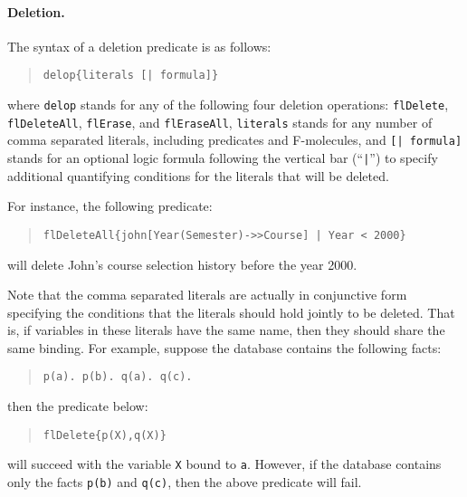\documentclass[11pt]{article}
\begin{document}
%
\paragraph{Deletion.} The syntax of a deletion predicate is as follows:
\begin{quote}
\begin{verbatim}
delop{literals [| formula]}
\end{verbatim}
\end{quote}
where {\tt delop} stands for any of the following four deletion
operations: {\tt flDelete}, {\tt flDeleteAll}, {\tt flErase}, and
{\tt flEraseAll}, {\tt literals} stands for any number of comma
separated literals, including predicates and \mbox{F-molecules},
and {\tt [| formula]} stands for an optional logic formula following
the vertical bar (``{\tt |}'') to specify additional quantifying
conditions for the literals that will be deleted.

For instance, the following predicate:
\begin{quote}
\begin{verbatim}
flDeleteAll{john[Year(Semester)->>Course] | Year < 2000}
\end{verbatim}
\end{quote}
will delete {\sf John}'s course selection history before the year
2000.

Note that the comma separated literals are actually in conjunctive
form specifying the conditions that the literals should hold jointly
to be deleted. That is, if variables in these literals have the same
name, then they should share the same binding. For example, suppose
the database contains the following facts:
\begin{quote}
\begin{verbatim}
p(a). p(b). q(a). q(c).
\end{verbatim}
\end{quote}
then the predicate below:
\begin{quote}
\begin{verbatim}
flDelete{p(X),q(X)}
\end{verbatim}
\end{quote}
will succeed with the variable {\tt X} bound to {\tt a}.  However, if
the database contains only the facts {\tt p(b)} and {\tt q(c)}, then
the above predicate will fail.
\end{document}
